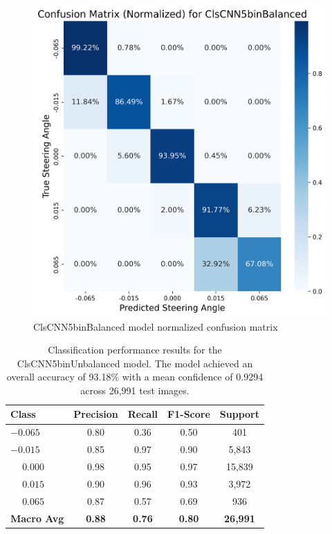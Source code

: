 \begin{figure}[H]
\centering
\includegraphics[width=0.65\linewidth]{Figures/Results/cm_norm_ClsCNN5binBalanced.png}
\caption{ClsCNN5binBalanced model normalized confusion matrix}
\label{fig:cm_norm_ClsCNN5binBalanced}
\end{figure}


\begin{table}[htbp]
\centering
\begin{tabular}{@{}lcccc@{}}
\toprule
\textbf{Class} & \textbf{Precision} & \textbf{Recall} & \textbf{F1-Score} & \textbf{Support} \\
\midrule
$-0.065$ & 0.80 & 0.36 & 0.50 & 401 \\
$-0.015$ & 0.85 & 0.97 & 0.90 & 5,843 \\
$\phantom{-}0.000$ & 0.98 & 0.95 & 0.97 & 15,839 \\
$\phantom{-}0.015$ & 0.90 & 0.96 & 0.93 & 3,972 \\
$\phantom{-}0.065$ & 0.87 & 0.57 & 0.69 & 936 \\
\midrule
\textbf{Macro Avg} & \textbf{0.88} & \textbf{0.76} & \textbf{0.80} & \textbf{26,991} \\
\bottomrule
\end{tabular}
\caption{Classification performance results for the ClsCNN5binUnbalanced model. The model achieved an overall accuracy of 93.18\% with a mean confidence of 0.9294 across 26,991 test images.}
\label{tab:clf_report_ClsCNN5binUnbalanced}
\end{table}


